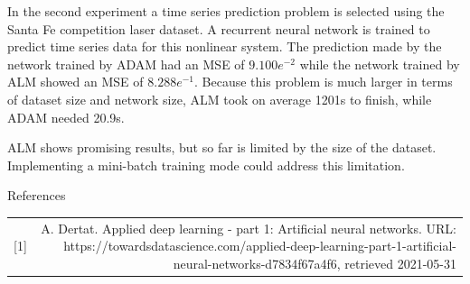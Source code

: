 In the second experiment a time series prediction problem is selected using the Santa Fe competition laser dataset. A recurrent neural network is trained to predict time series data for this nonlinear system. The prediction made by the network trained by ADAM had an MSE of $9.100e^{-2}$ while the network trained by ALM showed an MSE of $8.288e^{-1}$. Because this problem is much larger in terms of dataset size and network size, ALM took on average 1201s to finish, while ADAM needed 20.9s.

ALM shows promising results, but so far is limited by the size of the dataset. Implementing a mini-batch training mode could address this limitation.

\begin{frame}[fragile]{References}
\begin{tabular}{c r}
[1] & A. Dertat. Applied deep learning - part 1: Artificial neural networks. URL: https://towardsdatascience.com/applied-deep-learning-part-1-artificial-neural-networks-d7834f67a4f6, retrieved 2021-05-31 \\
\end{tabular}
\end{frame}









